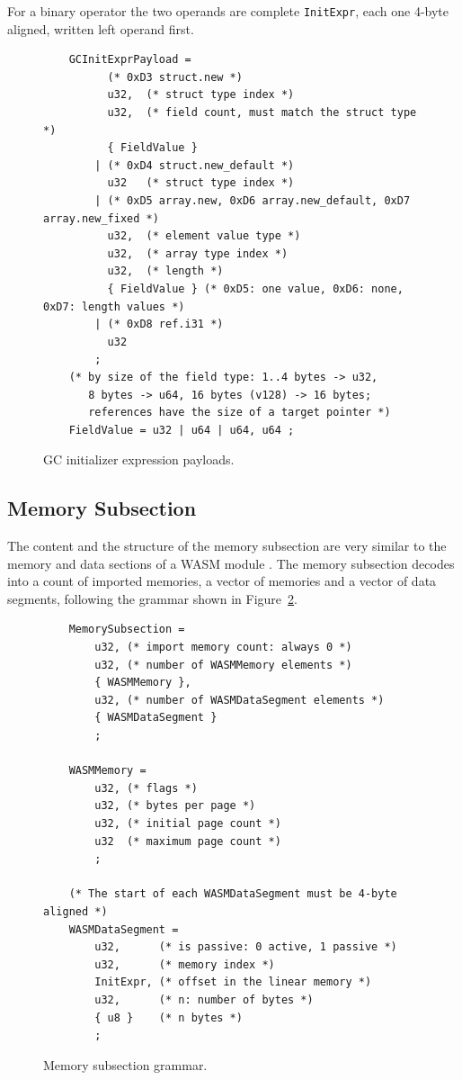 \documentclass{article}
\begin{document}
For a binary operator the two operands are complete \verb|InitExpr|, each one 4-byte aligned, written left operand first.

\begin{figure}[H]
\begin{verbatim}
    GCInitExprPayload =
          (* 0xD3 struct.new *)
          u32,  (* struct type index *)
          u32,  (* field count, must match the struct type *)
          { FieldValue }
        | (* 0xD4 struct.new_default *)
          u32   (* struct type index *)
        | (* 0xD5 array.new, 0xD6 array.new_default, 0xD7 array.new_fixed *)
          u32,  (* element value type *)
          u32,  (* array type index *)
          u32,  (* length *)
          { FieldValue } (* 0xD5: one value, 0xD6: none, 0xD7: length values *)
        | (* 0xD8 ref.i31 *)
          u32
        ;
    (* by size of the field type: 1..4 bytes -> u32,
       8 bytes -> u64, 16 bytes (v128) -> 16 bytes;
       references have the size of a target pointer *)
    FieldValue = u32 | u64 | u64, u64 ;
\end{verbatim}
\caption{GC initializer expression payloads.}
\label{fig:gc-init-expr}
\end{figure}

\subsection{Memory Subsection}
\label{sec:memory-subsection}

The content and the structure of the memory subsection are very similar to the memory and data sections of a WASM module \cite[Secs.~5.5.8 and 5.5.14]{webassembly2019core}.
The memory subsection decodes into a count of imported memories, a vector of memories and a vector of data segments, following the grammar shown in Figure~\ref{fig:memory-subsection-grammar}.

\begin{figure}[H]
\begin{verbatim}
    MemorySubsection =
        u32, (* import memory count: always 0 *)
        u32, (* number of WASMMemory elements *)
        { WASMMemory },
        u32, (* number of WASMDataSegment elements *)
        { WASMDataSegment }
        ;

    WASMMemory =
        u32, (* flags *)
        u32, (* bytes per page *)
        u32, (* initial page count *)
        u32  (* maximum page count *)
        ;

    (* The start of each WASMDataSegment must be 4-byte aligned *)
    WASMDataSegment =
        u32,      (* is passive: 0 active, 1 passive *)
        u32,      (* memory index *)
        InitExpr, (* offset in the linear memory *)
        u32,      (* n: number of bytes *)
        { u8 }    (* n bytes *)
        ;
\end{verbatim}
\caption{Memory subsection grammar.}
\label{fig:memory-subsection-grammar}
\end{figure}
\end{document}
